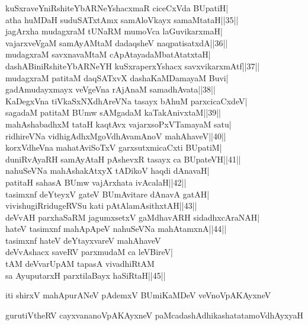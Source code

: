 \documentclass{article}
\begin{document}
kuSxraveYniRshiteYbARNeYshacxmaR ciceCxVda BUpatiH|\\
atha huMDaH suduSATxtAmx samAloVkayx samaMtataH||35||\\
jagArxha mudagxraM tUNaRM mumoVca laGuvikarxmaH|\\
vajarxveVgaM samAyAMtaM dadaqsheV naqpatisatxdA||36||\\
mudagxraM savxnavaMtaM cApAtayadaMbatAtatxtaH|\\
dashABiniRshiteYbARNeYH kuSxraperxYshacx savxvikarxmAtf||37||\\
mudagxraM patitaM daqSATxvX dashaKaMDamayaM Buvi|\\
gadAmudayxmayx veVgeVna rAjAnaM samadhAvata||38||\\
KaDegxVna tiVkaSxNXdhAreVNa tasayx bAhuM parxcicaCxdeV|\\
sagadaM patitaM BUmw sAMgadaM kaTakAnivxtaM||39||\\
mahAshabadhxM tataH kaqtAvx vajarxsoPxVTamayaM satu|\\
ridhireVNa vidhigAdhxMgoVdhAvamAnoV mahAhaveV||40||\\
korxVdheVna mahatAviSoTxV garxsutxmicaCxti BUpatiM|\\
duniRvAyaRH samAyAtaH pAshevxR tasayx ca BUpateVH||41||\\
nahuSeVNa mahAshakAtxyX tADikoV haqdi dAnavaH|\\
patitaH sahasA BUmw vajArxhata ivAcalaH||42||\\
tasimxnf deYteyxV gateV BUmAvitare dAnavA gatAH|\\
vivishugiRridugeRVSu kati pAtAlamAsithxtAH||43||\\
deVvAH parxhaSaRM jagumxsetxV gaMdhavARH sidadhxcAraNAH|\\
hateV tasimxnf mahApApeV nahuSeVNa mahAtamxnA||44||\\
tasimxnf hateV deYtayxvareV mahAhaveV\\
deVvAshacx saveRV parxmudaM ca leVBireV|\\
tAM deVvarUpAM tapasA vivadhiRtAM\\
sa AyuputarxH parxtilaBayx haSiRtaH||45||

\begin{center}
iti shirxV mahApurANeV pAdemxV BUmiKaMDeV veVnoVpAKAyxneV
\end{center}

\begin{center}
gurutiVtheRV cayxvananoVpAKAyxneV paMcadashAdhikashatatamoVdhAyxyaH
\end{center}
\end{document}
